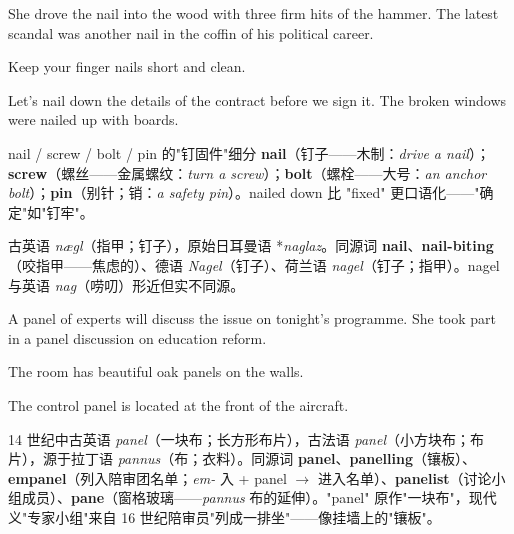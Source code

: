 \documentclass[../main.tex]{subfiles}
\begin{document}

{She drove the nail into the wood with three firm hits of the hammer.}
{The latest scandal was another nail in the coffin of his political career.}

{Keep your finger nails short and clean.}

{Let's nail down the details of the contract before we sign it.}
{The broken windows were nailed up with boards.}

\begin{gram}{nail / screw / bolt / pin 的"钉固件"细分}
\textbf{nail}（钉子——木制：\textit{drive a nail}）；\textbf{screw}（螺丝——金属螺纹：\textit{turn a screw}）；\textbf{bolt}（螺栓——大号：\textit{an anchor bolt}）；\textbf{pin}（别针；销：\textit{a safety pin}）。nailed down 比 "fixed" 更口语化——"确定"如"钉牢"。
\end{gram}

\begin{origin}
古英语 \textit{nægl}（指甲；钉子），原始日耳曼语 *\textit{naglaz}。同源词 \textbf{nail}、\textbf{nail-biting}（咬指甲——焦虑的）、德语 \textit{Nagel}（钉子）、荷兰语 \textit{nagel}（钉子；指甲）。nagel 与英语 \textit{nag}（唠叨）形近但实不同源。
\end{origin}


{A panel of experts will discuss the issue on tonight's programme.}
{She took part in a panel discussion on education reform.}

{The room has beautiful oak panels on the walls.}

{The control panel is located at the front of the aircraft.}

\begin{origin}
14 世纪中古英语 \textit{panel}（一块布；长方形布片），古法语 \textit{panel}（小方块布；布片），源于拉丁语 \textit{pannus}（布；衣料）。同源词 \textbf{panel}、\textbf{panelling}（镶板）、\textbf{empanel}（列入陪审团名单；\textit{em-} 入 + panel $\to$ 进入名单）、\textbf{panelist}（讨论小组成员）、\textbf{pane}（窗格玻璃——\textit{pannus} 布的延伸）。"panel" 原作"一块布"，现代义"专家小组"来自 16 世纪陪审员"列成一排坐"——像挂墙上的"镶板"。
\end{origin}
\end{document}
